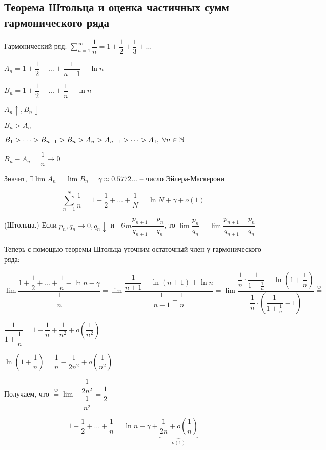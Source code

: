 \subsection{Теорема Штольца и оценка частичных сумм гармонического ряда}

Гармонический ряд: $\sum_{n=1}^{\infty} \dfrac{1}{n} = 1 + \dfrac{1}{2} + \dfrac{1}{3} + \dots$

$A_n = 1 + \dfrac{1}{2} + \dots + \dfrac{1}{n - 1} - \ln n$

$B_n = 1 + \dfrac{1}{2} + \dots + \dfrac{1}{n} - \ln n$

$A_n \uparrow, B_n \downarrow$

$B_n > A_n$

$B_1 > \dots > B_{n-1}> B_n > A_n > A_{n-1} > \dots > A_1,\; \forall n \in \mathbb{N}$

$B_n - A_n = \dfrac{1}{n} \to 0$ 

Значит, $\exists \lim A_n = \lim B_n = \gamma \approx 0.5772\dots$ -- число Эйлера-Маскерони

$$ \sum_{n=1}^{N} \dfrac{1}{n} = 1 + \dfrac{1}{2} + \dots + \dfrac{1}{N} = \ln N + \gamma + o(1) $$

\begin{theorem}
(Штольца.) Если $p_n, q_n \to 0, q_n \downarrow$ и $\exists lim \dfrac{p_{n + 1} - p_n}{q_{n + 1} - q_n}$, то
$\lim \dfrac{p_n}{q_n} = \lim \dfrac{p_{n + 1} - p_n}{q_{n + 1} - q_n}$
\end{theorem}

Теперь с помощью теоремы Штольца уточним остаточный член у гармонического ряда:

$\lim \dfrac{1 + \dfrac{1}{2} + \dots + \dfrac{1}{n} - \ln n - \gamma}{\dfrac{1}{n}} = \lim \dfrac{\dfrac{1}{n + 1} - \ln(n + 1) + \ln n}{\dfrac{1}{n + 1} - \dfrac{1}{n}} =
\lim \dfrac{\dfrac{1}{n} \cdot \dfrac{1}{1 + \frac{1}{n}} - \ln{\left(1 + \dfrac{1}{n}\right)}}{\dfrac{1}{n} \cdot \left(\dfrac{1}{1 + \frac{1}{n}} - 1\right)} \overset{\heartsuit}{=}$

$\dfrac{1}{1 + \dfrac{1}{n}} = 1 - \dfrac{1}{n} + \dfrac{1}{n^2} + o\left(\dfrac{1}{n^2}\right)$

$\ln\left(1 + \dfrac{1}{n}\right) = \dfrac{1}{n} - \dfrac{1}{2n^2} + o\left(\dfrac{1}{n^2}\right)$

Получаем, что $\overset{\heartsuit}{=} \lim \dfrac{-\dfrac{1}{2n^2}}{-\dfrac{1}{n^2}} = \dfrac{1}{2}$

$$ 1 + \dfrac{1}{2} + \dots + \dfrac{1}{n} = \ln n + \gamma + \underbrace{\dfrac{1}{2n} + o\left(\dfrac{1}{n}\right)}_{o(1)} $$

